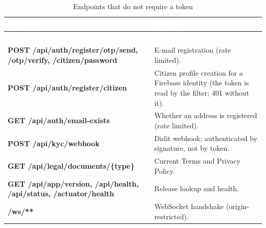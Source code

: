 {\tabfont\rowband
\begin{longtable}{@{}>{\raggedright\arraybackslash}p{}>{\raggedright\arraybackslash}p{}@{}}
\caption{Endpoints that do not require a token}\label{tab:public-endpoints}\\
\rowcolor{najdanavy}\textcolor{white}{\sffamily\bfseries\small Endpoint} & \textcolor{white}{\sffamily\bfseries\small Purpose}\\
\endfirsthead
\rowcolor{najdanavy}\textcolor{white}{\sffamily\bfseries\small Endpoint} & \textcolor{white}{\sffamily\bfseries\small Purpose}\\
\endhead
\bottomrule\endlastfoot
\textbf{POST /\allowbreak{}api/\allowbreak{}auth/\allowbreak{}register/\allowbreak{}otp/\allowbreak{}send, /\allowbreak{}otp/\allowbreak{}verify, /\allowbreak{}citizen/\allowbreak{}password} & E-mail registration (rate limited).\\
\textbf{POST /\allowbreak{}api/\allowbreak{}auth/\allowbreak{}register/\allowbreak{}citizen} & Citizen profile creation for a Firebase identity (the token is read by the filter; 401 without it).\\
\textbf{GET /\allowbreak{}api/\allowbreak{}auth/\allowbreak{}email-exists} & Whether an address is registered (rate limited).\\
\textbf{POST /\allowbreak{}api/\allowbreak{}kyc/\allowbreak{}webhook} & Didit webhook; authenticated by signature, not by token.\\
\textbf{GET /\allowbreak{}api/\allowbreak{}legal/\allowbreak{}documents/\allowbreak{}\{type\}} & Current Terms and Privacy Policy.\\
\textbf{GET /\allowbreak{}api/\allowbreak{}app/\allowbreak{}version, /\allowbreak{}api/\allowbreak{}health, /\allowbreak{}api/\allowbreak{}status, /\allowbreak{}actuator/\allowbreak{}health} & Release lookup and health.\\
\textbf{/\allowbreak{}ws/\allowbreak{}**} & WebSocket handshake (origin-restricted).\\
\end{longtable}}
